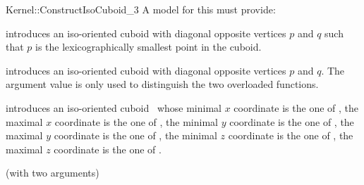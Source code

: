 \begin{ccRefFunctionObjectConcept}{Kernel::ConstructIsoCuboid_3}
A model for this must provide:


            {introduces an iso-oriented cuboid  with diagonal
             opposite vertices $p$ and $q$ such that $p$ is the
             lexicographically smallest point in the cuboid.}

            {introduces an iso-oriented cuboid with diagonal
             opposite vertices $p$ and $q$.  The  argument value is
             only used to distinguish the two overloaded functions.
             }

            {introduces an iso-oriented cuboid \ccVar\ whose
             minimal $x$ coordinate is the one of , the
             maximal $x$ coordinate is the one of , the
             minimal $y$ coordinate is the one of , the
             maximal $y$ coordinate is the one of , the
             minimal $z$ coordinate is the one of , the
             maximal $z$ coordinate is the one of .}

\ccRefines
{} (with two arguments)

\ccSeeAlso
{}  \\

\end{ccRefFunctionObjectConcept}
